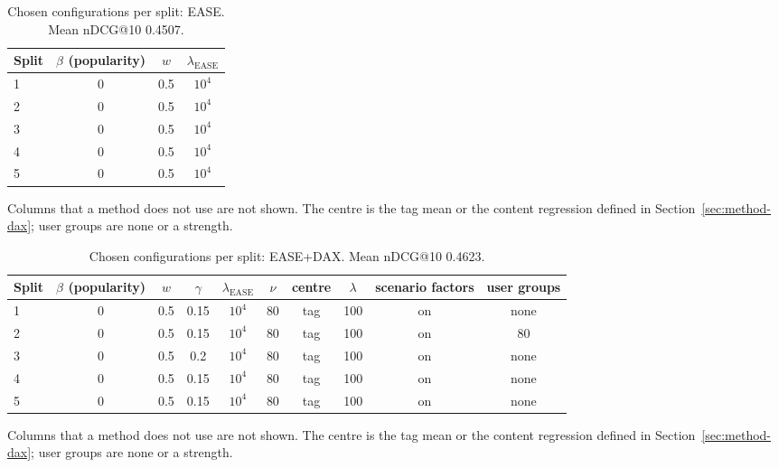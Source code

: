 \documentclass[preprint,12pt,authoryear]{elsarticle}
\begin{document}
\begin{table}[tbp]
\centering
\footnotesize
\caption{Chosen configurations per split: EASE. Mean nDCG@10 0.4507.}
\label{tab:grid04}
\begin{adjustbox}{max width=\linewidth}
\begin{tabular}{lccc}
\toprule
Split & $\beta$ (popularity) & $w$ & $\lambda_{\mathrm{EASE}}$ \\
\midrule
1 & 0 & 0.5 & $10^{4}$ \\
2 & 0 & 0.5 & $10^{4}$ \\
3 & 0 & 0.5 & $10^{4}$ \\
4 & 0 & 0.5 & $10^{4}$ \\
5 & 0 & 0.5 & $10^{4}$ \\
\bottomrule
\end{tabular}
\end{adjustbox}
\par\smallskip
\begin{minipage}{\linewidth}\raggedright\footnotesize Columns that a method does not use are not shown. The centre is the tag mean or the content regression defined in Section~\ref{sec:method-dax}; user groups are none or a strength.\end{minipage}
\end{table}

\begin{table}[tbp]
\centering
\footnotesize
\caption{Chosen configurations per split: EASE+DAX. Mean nDCG@10 0.4623.}
\label{tab:grid05}
\begin{adjustbox}{max width=\linewidth}
\begin{tabular}{lccccccccc}
\toprule
Split & $\beta$ (popularity) & $w$ & $\gamma$ & $\lambda_{\mathrm{EASE}}$ & $\nu$ & centre & $\lambda$ & scenario factors & user groups \\
\midrule
1 & 0 & 0.5 & 0.15 & $10^{4}$ & 80 & tag & 100 & on & none \\
2 & 0 & 0.5 & 0.15 & $10^{4}$ & 80 & tag & 100 & on & 80 \\
3 & 0 & 0.5 & 0.2 & $10^{4}$ & 80 & tag & 100 & on & none \\
4 & 0 & 0.5 & 0.15 & $10^{4}$ & 80 & tag & 100 & on & none \\
5 & 0 & 0.5 & 0.15 & $10^{4}$ & 80 & tag & 100 & on & none \\
\bottomrule
\end{tabular}
\end{adjustbox}
\par\smallskip
\begin{minipage}{\linewidth}\raggedright\footnotesize Columns that a method does not use are not shown. The centre is the tag mean or the content regression defined in Section~\ref{sec:method-dax}; user groups are none or a strength.\end{minipage}
\end{table}
\end{document}
